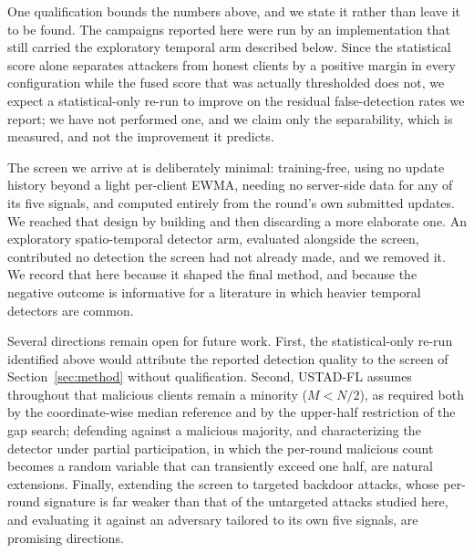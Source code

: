 \documentclass[journal]{IEEEtran}
\begin{document}
One qualification bounds the numbers above, and we state it rather than leave it to be found. The campaigns reported here were run by an implementation that still carried the exploratory temporal arm described below. Since the statistical score alone separates attackers from honest clients by a positive margin in every configuration while the fused score that was actually thresholded does not, we expect a statistical-only re-run to improve on the residual false-detection rates we report; we have not performed one, and we claim only the separability, which is measured, and not the improvement it predicts.

The screen we arrive at is deliberately minimal: training-free, using no update history beyond a light per-client EWMA, needing no server-side data for any of its five signals, and computed entirely from the round's own submitted updates. We reached that design by building and then discarding a more elaborate one. An exploratory spatio-temporal detector arm, evaluated alongside the screen, contributed no detection the screen had not already made, and we removed it. We record that here because it shaped the final method, and because the negative outcome is informative for a literature in which heavier temporal detectors are common.

Several directions remain open for future work. First, the statistical-only re-run identified above would attribute the reported detection quality to the screen of Section~\ref{sec:method} without qualification. Second, USTAD-FL assumes throughout that malicious clients remain a minority ($M < N/2$), as required both by the coordinate-wise median reference and by the upper-half restriction of the gap search; defending against a malicious majority, and characterizing the detector under partial participation, in which the per-round malicious count becomes a random variable that can transiently exceed one half, are natural extensions. Finally, extending the screen to targeted backdoor attacks, whose per-round signature is far weaker than that of the untargeted attacks studied here, and evaluating it against an adversary tailored to its own five signals, are promising directions.
\end{document}
